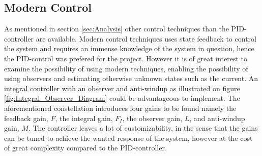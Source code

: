 \documentclass[../../main.tex]{subfiles}
\begin{document}
\subsection*{Modern Control}
As mentioned in section \ref{sec:Analysis} other control techniques than the PID-controller are available. Modern control techniques uses state feedback to control the system and requires an immense knowledge of the system in question, hence the PID-control was prefered for the project. However it is of great interest to examine the possibility of using modern techniques, enabling the possibility of using observers and estimating otherwise unknown states such as the current. An integral controller with an observer and anti-windup as illustrated on figure \ref{fig:Integral_Observer_Diagram} could be advantageous to implement. The aforementioned constellation introduces four gains to be found namely the feedback gain, $F$, the integral gain, $F_I$, the observer gain, $L$, and anti-windup gain, $M$. The controller leaves a lot of customizability, in the sense that the gains can be tuned to achieve the wanted response of the system, however at the cost of great complexity compared to the PID-controller.
\end{document}
